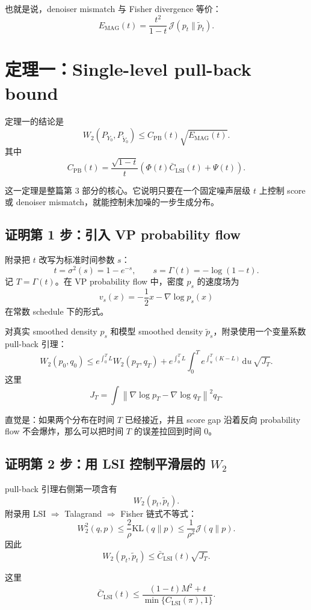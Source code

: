 \documentclass[UTF8,11pt]{ctexart}
\newcommand{\dd}{\,\mathrm{d}}
\newcommand{\KL}{\mathrm{KL}}
\begin{document}
也就是说，denoiser mismatch 与 Fisher divergence 等价：
\[
E_{\mathrm{MAG}}(t)
=
\frac{t^2}{1-t}\,
\mathcal J(p_t\|\widetilde p_t).
\]

\section{定理一：Single-level pull-back bound}

定理一的结论是
\[
W_2(P_{Y_0},P_{\widetilde Y_0})
\le
C_{\mathrm{PB}}(t)\sqrt{E_{\mathrm{MAG}}(t)}.
\]
其中
\[
C_{\mathrm{PB}}(t)
=
\frac{\sqrt{1-t}}{t}
\left(
\Phi(t)\bar C_{\mathrm{LSI}}(t)+\Psi(t)
\right).
\]

这一定理是整篇第 3 部分的核心。它说明只要在一个固定噪声层级 \(t\) 上控制 score 或 denoiser mismatch，就能控制未加噪的一步生成分布。

\subsection{证明第 1 步：引入 VP probability flow}

附录把 \(t\) 改写为标准时间参数 \(s\)：
\[
t=\sigma^2(s)=1-e^{-s},
\qquad
s=\Gamma(t)=-\log(1-t).
\]
记 \(T=\Gamma(t)\)。在 VP probability flow 中，密度 \(p_s\) 的速度场为
\[
v_s(x)
=
-\frac12x-\nabla\log p_s(x)
\]
在常数 schedule 下的形式。

对真实 smoothed density \(p_s\) 和模型 smoothed density \(\widetilde p_s\)，附录使用一个变量系数 pull-back 引理：
\[
W_2(p_0,q_0)
\le
e^{\int_0^T L}
W_2(p_T,q_T)
+
e^{\int_0^T L}
\int_0^T
e^{\int_u^T(K-L)}
\dd u\,
\sqrt{J_T}.
\]
这里
\[
J_T
=
\int
\left\|
\nabla\log p_T-\nabla\log q_T
\right\|^2q_T.
\]

直觉是：如果两个分布在时间 \(T\) 已经接近，并且 score gap 沿着反向 probability flow 不会爆炸，那么可以把时间 \(T\) 的误差拉回到时间 \(0\)。

\subsection{证明第 2 步：用 LSI 控制平滑层的 \(W_2\)}

pull-back 引理右侧第一项含有
\[
W_2(p_t,\widetilde p_t).
\]
附录用 LSI \(\Rightarrow\) Talagrand \(\Rightarrow\) Fisher 链式不等式：
\[
W_2^2(q,p)
\le
\frac{2}{\rho}\KL(q\|p)
\le
\frac{1}{\rho^2}\mathcal J(q\|p).
\]
因此
\[
W_2(p_t,\widetilde p_t)
\le
\bar C_{\mathrm{LSI}}(t)\sqrt{J_T}.
\]

这里
\[
\bar C_{\mathrm{LSI}}(t)
\le
\frac{(1-t)M^2+t}
{\min\{C_{\mathrm{LSI}}(\pi),1\}}.
\]
\end{document}
